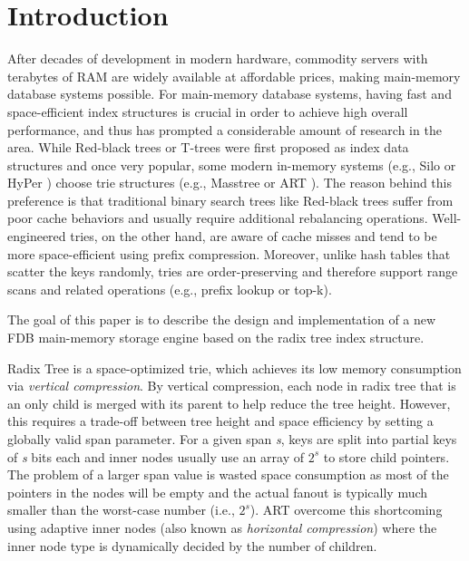 \documentclass[sigplan,screen,nonacm]{acmart}
\begin{document}
\maketitle

\section{Introduction}
\label{sec:intro}
After decades of development in modern hardware, commodity servers with terabytes of RAM are widely available at affordable prices, making main-memory database systems possible. For main-memory database systems, having fast and space-efficient index structures is crucial in order to achieve high overall performance, and thus has prompted a considerable amount of research in the area. While Red-black trees \cite{bayer1972symmetric} or T-trees \cite{lehman1985study} were first proposed as index data structures and once very popular, some modern in-memory systems (e.g., Silo \cite{tu2013speedy} or HyPer \cite{kemper2011hyper}) choose trie structures (e.g., Masstree \cite{mao2012cache} or ART \cite{leis2013adaptive}). The reason behind this preference is that traditional binary search trees like Red-black trees suffer from poor cache behaviors \cite{rao1998cache} and usually require additional rebalancing operations. Well-engineered tries, on the other hand, are aware of cache misses and tend to be more space-efficient using prefix compression. Moreover, unlike hash tables that scatter the keys randomly, tries are order-preserving and therefore support range scans and related operations (e.g., prefix lookup or top-k).

The goal of this paper is to describe the design and implementation of a new FDB main-memory storage engine based on the radix tree index structure. 

Radix Tree is a space-optimized trie, which achieves its low memory consumption via {\itshape vertical compression}. By vertical compression, each node in radix tree that is an only child is merged with its parent to help reduce the tree height. However, this requires a trade-off between tree height and space efficiency by setting a globally valid span parameter. For a given span {\itshape s}, keys are split into partial keys of {\itshape s} bits each and inner nodes usually use an array of $2^{s}$ to store child pointers. The problem of a larger span value is wasted space consumption as most of the pointers in the nodes will be empty and the actual fanout is typically much smaller than the worst-case number (i.e., $2^{s}$). ART \cite{leis2013adaptive} overcome this shortcoming using adaptive inner nodes (also known as {\itshape horizontal compression}) where the inner node type is dynamically decided by the number of children. 
\end{document}
